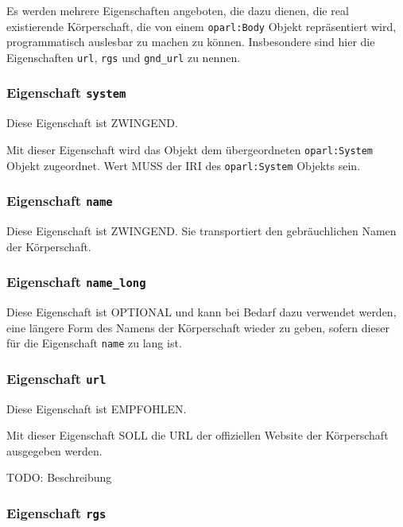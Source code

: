 \documentclass[,a4paper]{article}
\begin{document}
Es werden mehrere Eigenschaften angeboten, die dazu dienen, die real
existierende Körperschaft, die von einem \texttt{oparl:Body} Objekt
repräsentiert wird, programmatisch auslesbar zu machen zu können.
Insbesondere sind hier die Eigenschaften \texttt{url}, \texttt{rgs} und
\texttt{gnd\_url} zu nennen.

\subsubsection{Eigenschaft \texttt{system}}\label{eigenschaft-system}

Diese Eigenschaft ist ZWINGEND.

Mit dieser Eigenschaft wird das Objekt dem übergeordneten
\texttt{oparl:System} Objekt zugeordnet. Wert MUSS der IRI des
\texttt{oparl:System} Objekts sein.

\subsubsection{Eigenschaft \texttt{name}}\label{eigenschaft-name}

Diese Eigenschaft ist ZWINGEND. Sie transportiert den gebräuchlichen
Namen der Körperschaft.

\subsubsection{Eigenschaft
\texttt{name\_long}}\label{eigenschaft-nameux5flong}

Diese Eigenschaft ist OPTIONAL und kann bei Bedarf dazu verwendet
werden, eine längere Form des Namens der Körperschaft wieder zu geben,
sofern dieser für die Eigenschaft \texttt{name} zu lang ist.

\subsubsection{Eigenschaft \texttt{url}}\label{eigenschaft-url}

Diese Eigenschaft ist EMPFOHLEN.

Mit dieser Eigenschaft SOLL die URL der offiziellen Website der
Körperschaft ausgegeben werden.

TODO: Beschreibung

\subsubsection{Eigenschaft \texttt{rgs}}\label{eigenschaft-rgs}
\end{document}
